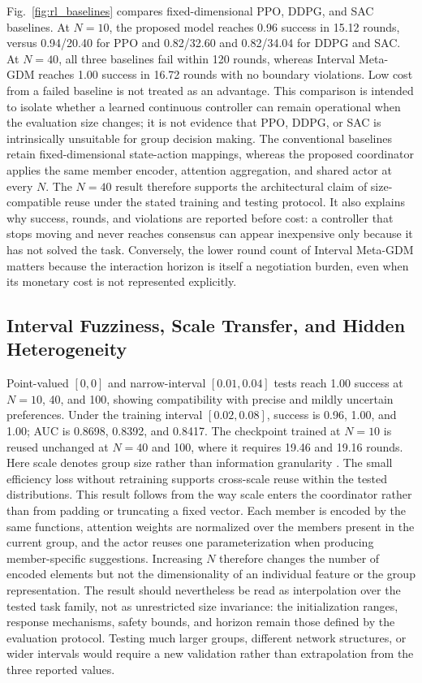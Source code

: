 \documentclass[journal]{IEEEtran}
\begin{document}
Fig.~\ref{fig:rl_baselines} compares fixed-dimensional PPO, DDPG, and SAC baselines. At $N=10$, the proposed model reaches 0.96 success in 15.12 rounds, versus 0.94/20.40 for PPO and 0.82/32.60 and 0.82/34.04 for DDPG and SAC. At $N=40$, all three baselines fail within 120 rounds, whereas Interval Meta-GDM reaches 1.00 success in 16.72 rounds with no boundary violations. Low cost from a failed baseline is not treated as an advantage. This comparison is intended to isolate whether a learned continuous controller can remain operational when the evaluation size changes; it is not evidence that PPO, DDPG, or SAC is intrinsically unsuitable for group decision making. The conventional baselines retain fixed-dimensional state-action mappings, whereas the proposed coordinator applies the same member encoder, attention aggregation, and shared actor at every $N$. The $N=40$ result therefore supports the architectural claim of size-compatible reuse under the stated training and testing protocol. It also explains why success, rounds, and violations are reported before cost: a controller that stops moving and never reaches consensus can appear inexpensive only because it has not solved the task. Conversely, the lower round count of Interval Meta-GDM matters because the interaction horizon is itself a negotiation burden, even when its monetary cost is not represented explicitly.

\subsection{Interval Fuzziness, Scale Transfer, and Hidden Heterogeneity}

Point-valued $[0,0]$ and narrow-interval $[0.01,0.04]$ tests reach 1.00 success at $N=10$, 40, and 100, showing compatibility with precise and mildly uncertain preferences. Under the training interval $[0.02,0.08]$, success is 0.96, 1.00, and 1.00; AUC is 0.8698, 0.8392, and 0.8417. The checkpoint trained at $N=10$ is reused unchanged at $N=40$ and 100, where it requires 19.46 and 19.16 rounds. Here scale denotes group size rather than information granularity \cite{ref22}. The small efficiency loss without retraining supports cross-scale reuse within the tested distributions. This result follows from the way scale enters the coordinator rather than from padding or truncating a fixed vector. Each member is encoded by the same functions, attention weights are normalized over the members present in the current group, and the actor reuses one parameterization when producing member-specific suggestions. Increasing $N$ therefore changes the number of encoded elements but not the dimensionality of an individual feature or the group representation. The result should nevertheless be read as interpolation over the tested task family, not as unrestricted size invariance: the initialization ranges, response mechanisms, safety bounds, and horizon remain those defined by the evaluation protocol. Testing much larger groups, different network structures, or wider intervals would require a new validation rather than extrapolation from the three reported values.
\end{document}
